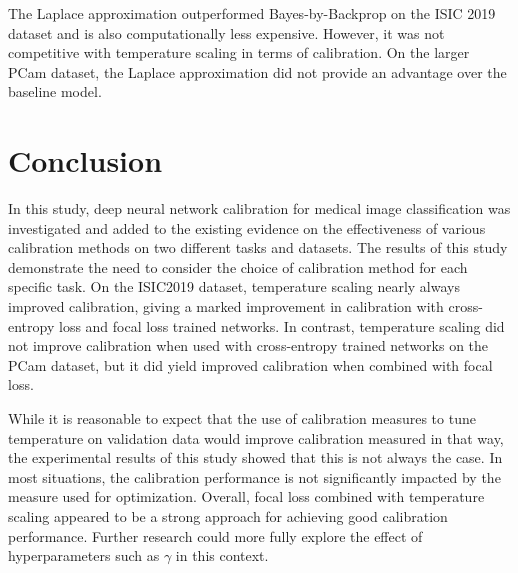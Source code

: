 The Laplace approximation outperformed Bayes-by-Backprop on the ISIC 2019 dataset and is also computationally less expensive. However, it was not competitive with temperature scaling in terms of calibration. On the larger PCam dataset, the Laplace approximation did not provide an advantage over the baseline model.



\section{Conclusion}
\label{sec:calibration_conclusion}
In this study, deep neural network calibration for medical image classification was investigated and added to the existing evidence on the effectiveness of various calibration methods on two different tasks and datasets. The results of this study demonstrate the need to consider the choice of calibration method for each specific task. On the ISIC2019 dataset, temperature scaling nearly always improved calibration, giving a marked improvement in calibration with cross-entropy loss and focal loss trained networks. In contrast, temperature scaling did not improve calibration when used with cross-entropy trained networks on the PCam dataset, but it did yield improved calibration when combined with focal loss.

While it is reasonable to expect that the use of calibration measures to tune temperature on validation data would improve calibration measured in that way, the experimental results of this study showed that this is not always the case. In most situations, the calibration performance is not significantly impacted by the measure used for optimization. Overall, focal loss combined with temperature scaling appeared to be a strong approach for achieving good calibration performance. Further research could more fully explore the effect of hyperparameters such as $\gamma$ in this context.